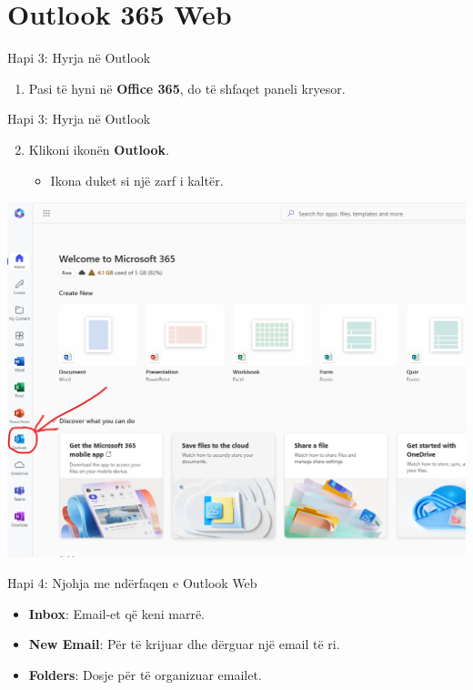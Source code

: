 \documentclass[
  ignorenonframetext,
]{beamer}
\providecommand{\tightlist}{%
  \setlength{\itemsep}{0pt}\setlength{\parskip}{0pt}}
\begin{document}
\section{Outlook 365 Web}\label{outlook-365-web}

\begin{frame}{Hapi 3: Hyrja në Outlook}
\label{hapi-3-hyrja-nuxeb-outlook}
\begin{enumerate}
\tightlist
\item
  Pasi të hyni në \textbf{Office 365}, do të shfaqet paneli kryesor.
\end{enumerate}
\end{frame}

\begin{frame}{Hapi 3: Hyrja në Outlook}
\label{hapi-3-hyrja-nuxeb-outlook-1}
\begin{enumerate}
\setcounter{enumi}{1}
\tightlist
\item
  Klikoni ikonën \textbf{Outlook}.

  \begin{itemize}
  \tightlist
  \item
    Ikona duket si një zarf i kaltër.
  \end{itemize}
\end{enumerate}

\includegraphics{./images/outlook3.png}
\end{frame}

\begin{frame}{Hapi 4: Njohja me ndërfaqen e Outlook Web}
\label{hapi-4-njohja-me-nduxebrfaqen-e-outlook-web}
\begin{itemize}
\item
  \textbf{Inbox}: Email-et që keni marrë.
\item
  \textbf{New Email}: Për të krijuar dhe dërguar një email të ri.
\item
  \textbf{Folders}: Dosje për të organizuar emailet.
\end{itemize}
\end{frame}
\end{document}
